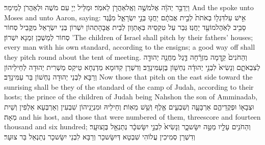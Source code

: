 \newperek
{}
{וַיְדַבֵּ֣ר יְהֹוָ֔ה אֶל\maqqaf מֹשֶׁ֥ה וְאֶֽל\maqqaf אַהֲרֹ֖ן לֵאמֹֽר׃}
{וּמַלֵּיל יְיָ עִם מֹשֶׁה וּלְאַהֲרֹן לְמֵימַר׃}
{And the \lord\space spoke unto Moses and unto Aaron, saying:}{}
{אִ֣ישׁ עַל\maqqaf דִּגְל֤וֹ בְאֹתֹת֙ לְבֵ֣ית אֲבֹתָ֔ם יַחֲנ֖וּ בְּנֵ֣י יִשְׂרָאֵ֑ל מִנֶּ֕גֶד סָבִ֥יב לְאֹֽהֶל\maqqaf מוֹעֵ֖ד יַחֲנֽוּ׃}
{גְּבַר עַל טִקְסֵיהּ בְּאָתְוָון לְבֵית אֲבָהָתְהוֹן יִשְׁרוֹן בְּנֵי יִשְׂרָאֵל מִקֳּבֵיל סְחוֹר סְחוֹר לְמַשְׁכַּן זִמְנָא יִשְׁרוֹן׃}
{’The children of Israel shall pitch by their fathers’ houses; every man with his own standard, according to the ensigns; a good way off shall they pitch round about the tent of meeting.}{}
{וְהַחֹנִים֙ קֵ֣דְמָה מִזְרָ֔חָה דֶּ֛גֶל מַחֲנֵ֥ה יְהוּדָ֖ה לְצִבְאֹתָ֑ם וְנָשִׂיא֙ לִבְנֵ֣י יְהוּדָ֔ה נַחְשׁ֖וֹן בֶּן\maqqaf עַמִּינָדָֽב׃}
{וְדִשְׁרַן קִדּוּמָא מַדְנְחָא טֵיקַס מַשְׁרִית יְהוּדָה לְחֵילֵיהוֹן וְרַבָּא לִבְנֵי יְהוּדָה נַחְשׁוֹן בַּר עַמִּינָדָב׃}
{Now those that pitch on the east side toward the sunrising shall be they of the standard of the camp of Judah, according to their hosts; the prince of the children of Judah being Nahshon the son of Amminadab,}{}
{וּצְבָא֖וֹ וּפְקֻדֵיהֶ֑ם אַרְבָּעָ֧ה וְשִׁבְעִ֛ים אֶ֖לֶף וְשֵׁ֥שׁ מֵאֽוֹת׃}
{וְחֵילֵיהּ וּמִנְיָנֵיהוֹן שִׁבְעִין וְאַרְבְּעָא אַלְפִין וְשֵׁית מְאָה׃}
{and his host, and those that were numbered of them, threescore and fourteen thousand and six hundred;}{}
{וְהַחֹנִ֥ים עָלָ֖יו מַטֵּ֣ה יִשָּׂשכָ֑ר וְנָשִׂיא֙ לִבְנֵ֣י יִשָּׂשכָ֔ר נְתַנְאֵ֖ל בֶּן\maqqaf צוּעָֽר׃}
{וְדִשְׁרַן סְמִיכִין עֲלוֹהִי שִׁבְטָא דְּיִשָּׂשכָר וְרַבָּא לִבְנֵי יִשָּׂשכָר נְתַנְאֵל בַּר צוּעָר׃}
